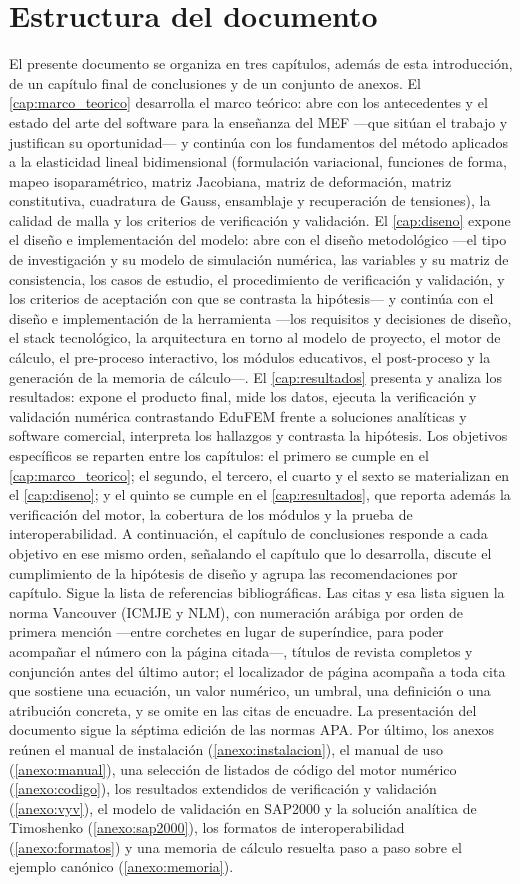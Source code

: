 \section*{Estructura del documento}

El presente documento se organiza en tres capítulos, además de esta introducción, de un capítulo final de conclusiones y de un conjunto de anexos. El \autoref{cap:marco_teorico} desarrolla el marco teórico: abre con los antecedentes y el estado del arte del software para la enseñanza del MEF —que sitúan el trabajo y justifican su oportunidad— y continúa con los fundamentos del método aplicados a la elasticidad lineal bidimensional (formulación variacional, funciones de forma, mapeo isoparamétrico, matriz Jacobiana, matriz de deformación, matriz constitutiva, cuadratura de Gauss, ensamblaje y recuperación de tensiones), la calidad de malla y los criterios de verificación y validación. El \autoref{cap:diseno} expone el diseño e implementación del modelo: abre con el diseño metodológico —el tipo de investigación y su modelo de simulación numérica, las variables y su matriz de consistencia, los casos de estudio, el procedimiento de verificación y validación, y los criterios de aceptación con que se contrasta la hipótesis— y continúa con el diseño e implementación de la herramienta —los requisitos y decisiones de diseño, el stack tecnológico, la arquitectura en torno al modelo de proyecto, el motor de cálculo, el pre-proceso interactivo, los módulos educativos, el post-proceso y la generación de la memoria de cálculo—. El \autoref{cap:resultados} presenta y analiza los resultados: expone el producto final, mide los datos, ejecuta la verificación y validación numérica contrastando EduFEM frente a soluciones analíticas y software comercial, interpreta los hallazgos y contrasta la hipótesis. Los objetivos específicos se reparten entre los capítulos: el primero se cumple en el \autoref{cap:marco_teorico}; el segundo, el tercero, el cuarto y el sexto se materializan en el \autoref{cap:diseno}; y el quinto se cumple en el \autoref{cap:resultados}, que reporta además la verificación del motor, la cobertura de los módulos y la prueba de interoperabilidad. A continuación, el capítulo de conclusiones responde a cada objetivo en ese mismo orden, señalando el capítulo que lo desarrolla, discute el cumplimiento de la hipótesis de diseño y agrupa las recomendaciones por capítulo. Sigue la lista de referencias bibliográficas. Las citas y esa lista siguen la norma Vancouver (ICMJE y NLM), con numeración arábiga por orden de primera mención —entre corchetes en lugar de superíndice, para poder acompañar el número con la página citada—, títulos de revista completos y conjunción antes del último autor; el localizador de página acompaña a toda cita que sostiene una ecuación, un valor numérico, un umbral, una definición o una atribución concreta, y se omite en las citas de encuadre. La presentación del documento sigue la séptima edición de las normas APA. Por último, los anexos reúnen el manual de instalación (\autoref{anexo:instalacion}), el manual de uso (\autoref{anexo:manual}), una selección de listados de código del motor numérico (\autoref{anexo:codigo}), los resultados extendidos de verificación y validación (\autoref{anexo:vyv}), el modelo de validación en SAP2000 y la solución analítica de Timoshenko (\autoref{anexo:sap2000}), los formatos de interoperabilidad (\autoref{anexo:formatos}) y una memoria de cálculo resuelta paso a paso sobre el ejemplo canónico (\autoref{anexo:memoria}).